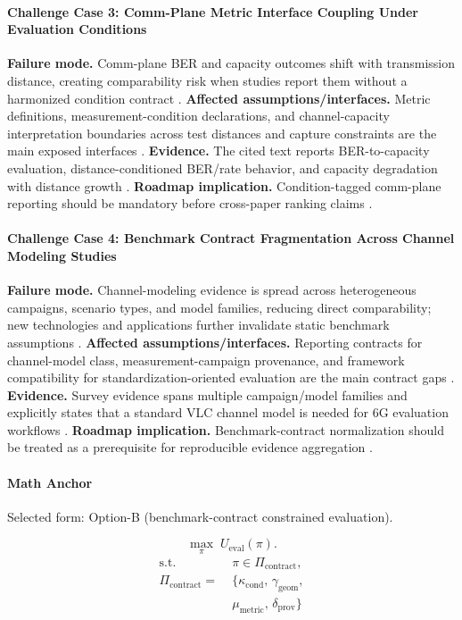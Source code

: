 \documentclass[letterpaper,journal]{IEEEtran}
\begin{document}
\paragraph{Challenge Case 3: Comm-Plane Metric Interface Coupling Under Evaluation Conditions}
\textbf{Failure mode.} Comm-plane BER and capacity outcomes shift with transmission distance, creating comparability risk when studies report them without a harmonized condition contract \cite{O_ISAC_381}. \textbf{Affected assumptions/interfaces.} Metric definitions, measurement-condition declarations, and channel-capacity interpretation boundaries across test distances and capture constraints are the main exposed interfaces \cite{O_ISAC_381}. \textbf{Evidence.} The cited text reports BER-to-capacity evaluation, distance-conditioned BER/rate behavior, and capacity degradation with distance growth \cite{O_ISAC_381}. \textbf{Roadmap implication.} Condition-tagged comm-plane reporting should be mandatory before cross-paper ranking claims \cite{O_ISAC_381}.

\paragraph{Challenge Case 4: Benchmark Contract Fragmentation Across Channel Modeling Studies}
\textbf{Failure mode.} Channel-modeling evidence is spread across heterogeneous campaigns, scenario types, and model families, reducing direct comparability; new technologies and applications further invalidate static benchmark assumptions \cite{O_ISAC_327}. \textbf{Affected assumptions/interfaces.} Reporting contracts for channel-model class, measurement-campaign provenance, and framework compatibility for standardization-oriented evaluation are the main contract gaps \cite{O_ISAC_327}. \textbf{Evidence.} Survey evidence spans multiple campaign/model families and explicitly states that a standard VLC channel model is needed for 6G evaluation workflows \cite{O_ISAC_327}. \textbf{Roadmap implication.} Benchmark-contract normalization should be treated as a prerequisite for reproducible evidence aggregation \cite{O_ISAC_327}.

\paragraph{Math Anchor}
Selected form: Option-B (benchmark-contract constrained evaluation).

\begin{equation}
    \max_{\pi}\; U_{\mathrm{eval}}(\pi).
\end{equation}
\begin{equation}
    \begin{split}
        \text{s.t.}\;               & \pi \in \Pi_{\mathrm{contract}},                   \\
        \Pi_{\mathrm{contract}} =\; & \{\kappa_{\mathrm{cond}},\,\gamma_{\mathrm{geom}}, \\
                                    & \mu_{\mathrm{metric}},\,\delta_{\mathrm{prov}}\}
    \end{split}
\end{equation}
\end{document}
